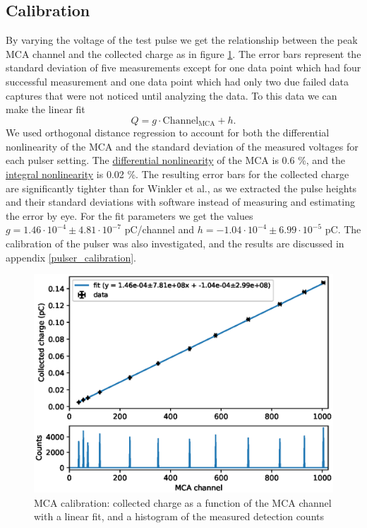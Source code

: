 \documentclass[a4paper]{article}
\begin{document}
\subsection{Calibration}
\label{results_calibration}
By varying the voltage of the test pulse we get the relationship between the peak MCA channel and the collected charge as in figure \ref{fig:mca_calibration}.
The error bars represent the standard deviation of five measurements except for one data point which had four successful measurement and one data point which had only two due failed data captures that were not noticed until analyzing the data.
To this data we can make the linear fit
\begin{equation}
Q = g \cdot \text{Channel}_\text{MCA} + h.
\label{eq:calibration}
\end{equation}
We used orthogonal distance regression to account for both the differential nonlinearity of the MCA and the standard deviation of the measured voltages for each pulser setting.
The
\href{https://en.wikipedia.org/wiki/Differential_nonlinearity}{differential nonlinearity}
of the MCA is 0.6 \%, and the
\href{https://en.wikipedia.org/wiki/Integral_nonlinearity}{integral nonlinearity}
is 0.02 \%.
The resulting error bars for the collected charge are significantly tighter than for Winkler et al., as we extracted the pulse heights and their standard deviations with software instead of measuring and estimating the error by eye.
For the fit parameters we get the values $g = 1.46 \cdot 10^{-4} \pm 4.81 \cdot 10^{-7}$ pC/channel and $h = -1.04 \cdot 10^{-4} \pm 6.99 \cdot 10^{-5}$ pC.
The calibration of the pulser was also investigated, and the results are discussed in appendix \ref{pulser_calibration}.


\begin{figure}[ht!]
\centering
\includegraphics[width=\textwidth]{fig/python/mca_calibration.eps}
\caption{MCA calibration: collected charge as a function of the MCA channel with a linear fit, and a histogram of the measured detection counts}
\label{fig:mca_calibration}
\end{figure}
\end{document}
